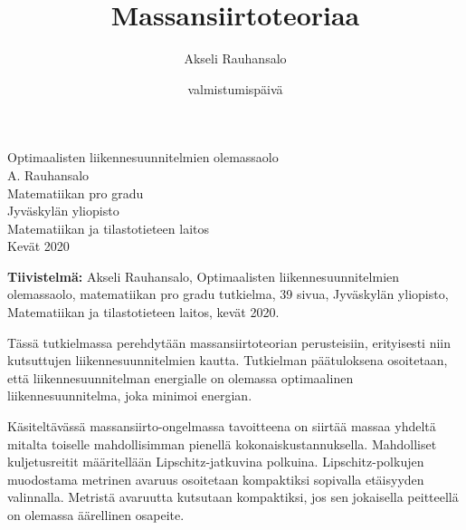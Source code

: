 
\title{Massansiirtoteoriaa}
\author{Akseli Rauhansalo}
\date{valmistumispäivä}


\thispagestyle{empty}                   %
\begin{center}                          %
\null\vspace{3cm}                       %
\Large                                  %
Optimaalisten liikennesuunnitelmien olemassaolo \\[2cm]                     %
\large                                  %
A. Rauhansalo\\[1cm]                    %
\vfill                                  %
\normalsize                             %
Matematiikan pro gradu\\[1cm]           %
Jyväskylän yliopisto\\                  %
Matematiikan ja tilastotieteen laitos\\ %
Kevät 2020                              %
\end{center}                            %
\frontmatter

\noindent
\textbf{Tiivistelmä:} Akseli Rauhansalo, Optimaalisten liikennesuunnitelmien olemassaolo, matematiikan pro gradu tutkielma, 39 sivua, Jyväskylän yliopisto, Matematiikan ja tilastotieteen laitos, kevät 2020.

\vspace{1pc}
Tässä tutkielmassa perehdytään massansiirtoteorian perusteisiin, erityisesti niin kutsuttujen liikennesuunnitelmien kautta. Tutkielman päätuloksena osoitetaan, että liikennesuunnitelman energialle on olemassa optimaalinen liikennesuunnitelma, joka minimoi energian. 

Käsiteltävässä massansiirto-ongelmassa tavoitteena on siirtää massaa yhdeltä mitalta toiselle mahdollisimman pienellä kokonaiskustannuksella. Mahdolliset kuljetusreitit määritellään Lipschitz-jatkuvina polkuina. Lipschitz-polkujen muodostama metrinen avaruus osoitetaan kompaktiksi sopivalla etäisyyden valinnalla. Metristä avaruutta kutsutaan kompaktiksi, jos sen jokaisella peitteellä on olemassa äärellinen osapeite. 

